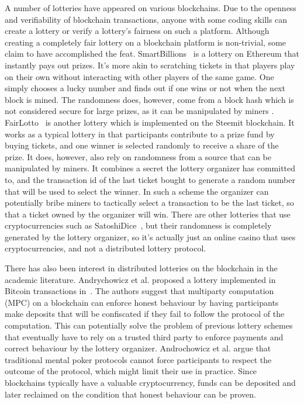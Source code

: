 A number of lotteries have appeared on various blockchains. Due to the openness and verifiability of blockchain transactions, anyone with some coding skills can create a lottery or verify a lottery's fairness on such a platform. Although creating a completely fair lottery on a blockchain platform is non-trivial, some claim to have accomplished the feat. SmartBillions~\cite{noauthor_smartbillions_nodate} is a lottery on Ethereum that instantly pays out prizes. It's more akin to scratching tickets in that players play on their own without interacting with other players of the same game. One simply chooses a lucky number and finds out if one wins or not when the next block is mined. The randomness does, however, come from a block hash which is not considered secure for large prizes, as it can be manipulated by miners \cite{bonneau_bitcoin_2015, pierrot_malleability_2018}. 
FairLotto~\cite{ago_fairlotto_2018} is another lottery which is implemented on the Steemit blockchain. It works as a typical lottery in that participants contribute to a prize fund by buying tickets, and one winner is selected randomly to receive a share of the prize. It does, however, also rely on randomness from a source that can be manipulated by miners. It combines a secret the lottery organizer has committed to, and the transaction id of the last ticket bought to generate a random number that will be used to select the winner. In such a scheme the organizer can potentially bribe miners to tactically select a transaction to be the last ticket, so that a ticket owned by the organizer will win. 
There are other lotteries that use cryptocurrencies such as SatoshiDice~\cite{noauthor_satoshi_nodate}, but their randomness is completely generated by the lottery organizer, so it's actually just an online casino that uses cryptocurrencies, and not a distributed lottery protocol.

There has also been interest in distributed lotteries on the blockchain in the academic literature. Andrychowicz et al. proposed a lottery implemented in Bitcoin transactions in~\cite{andrychowicz_secure_2014}. The authors suggest that multiparty computation (MPC) on a blockchain can enforce honest behaviour by having participants make deposits that will be confiscated if they fail to follow the protocol of the computation. This can potentially solve the problem of previous lottery schemes that eventually have to rely on a trusted third party to enforce payments and correct behaviour by the lottery organizer. Androchowicz et al. argue that traditional mental poker protocols cannot force participants to respect the outcome of the protocol, which might limit their use in practice. Since blockchains typically have a valuable cryptocurrency, funds can be deposited and later reclaimed on the condition that honest behaviour can be proven.

